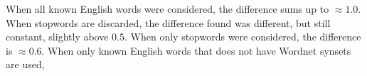 																																																																																																																																																																																																																																																																																																																																																																																																				When all known English words were considered, 
																																																																																																																																																																																																																																																																																																																																																																																																				the difference sums up to $\approx 1.0$.
																																																																																																																																																																																																																																																																																																																																																																																																				When stopwords are discarded,
																																																																																																																																																																																																																																																																																																																																																																																																				the difference found was different, but still constant, slightly above $0.5$.
																																																																																																																																																																																																																																																																																																																																																																																																				When only stopwords were considered, the difference is $\approx 0.6$.
																																																																																																																																																																																																																																																																																																																																																																																																				When only known English words that does not have Wordnet synsets are used,

